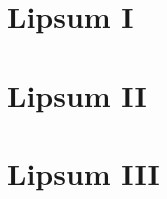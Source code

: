 \documentclass{book}
\begin{document}
\pagestyle{empty} %

\chapter{Lipsum I}

\lipsum[1-6]

\chapter{Lipsum II}

\lipsum[2-8]

\chapter{Lipsum III}

\lipsum[4-10]
\end{document}
